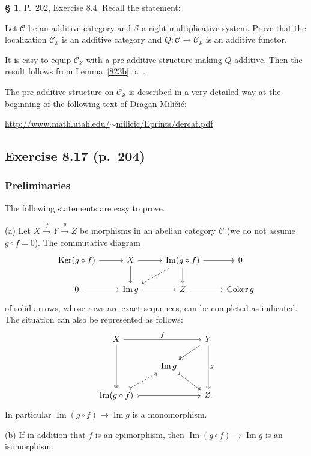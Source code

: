 \documentclass[12pt]{article}%
\theoremstyle{remark}
\theoremstyle{definition}
\newtheorem{s}[thm]{\S}%
\newcommand{\nn}{\noindent}
\newcommand{\cc}{\mathcal}
\newcommand{\C}{\mathcal C}
\newcommand{\xr}{\xrightarrow}
\DeclareMathOperator{\Coker}{Coker}
\DeclareMathOperator{\Ima}{Im}
\DeclareMathOperator{\Ker}{Ker}
\begin{document}
%
%
\begin{s} 
P.~202, Exercise 8.4. Recall the statement: 

Let $\C$ be an additive category and $\cc S$ a right multiplicative system. Prove that the localization $\C_{\cc S}$ is an additive category and $Q:\C\to\C_{\cc S}$ is an additive functor. 

It is easy to equip $\C_{\cc S}$ with a pre-additive structure making $Q$ additive. Then the result follows from Lemma~\ref{823b} p.~\pageref{823b}. 

The pre-additive structure on $\C_{\cc S}$ is described in a very detailed way at the beginning of the following text of Dragan Mili\v{c}i\'c:%
%
\begin{center}\href{http://www.math.utah.edu/~milicic/Eprints/dercat.pdf}{http://www.math.utah.edu/$\sim$milicic/Eprints/dercat.pdf}
\end{center}
\end{s}
%
%
\subsection{Exercise 8.17 (p.~204)}\label{817} 
%
\subsubsection{Preliminaries}\label{preli}
%
The following statements are easy to prove.

\nn(a) Let $X\xr fY\xr gZ$ be morphisms in an abelian category $\C$ (we do not assume $g\circ f=0$). The commutative diagram 
$$
\begin{tikzcd}
\Ker(g\circ f)\ar{r}&X\ar{d}\ar{r}&\Ima(g\circ f)\ar[dashed]{dl}\ar{d}\ar{r}&0\\ 
0\ar{r}&\Ima g\ar{r}&Z\ar{r}&\Coker g
\end{tikzcd}
$$ 
of solid arrows, whose rows are exact sequences, can be completed as indicated. The situation can also be represented as follows: 
$$
\begin{tikzcd}
X\ar[two heads]{dd}\ar{rr}{f}&&Y\ar[two heads]{dl}\ar{dd}{g}\\ 
{}&\Ima g\ar[tail]{dr}\\ 
\Ima(g\circ f)\ar[dashed,tail]{ur}\ar[tail]{rr}&&Z.
\end{tikzcd}
$$ 
In particular $\Ima(g\circ f)\to\Ima g$ is a monomorphism.

\nn(b) If in addition that $f$ is an epimorphism, then $\Ima(g\circ f)\to\Ima g$ is an isomorphism. 
\end{document}
